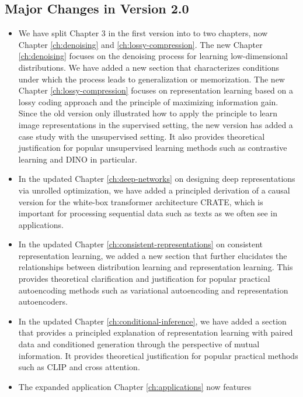 \documentclass[../../book-main.tex]{subfiles}
\begin{document}
\subsection*{Major Changes in Version 2.0}
\begin{itemize}
    \item We have split Chapter 3 in the first version into to two chapters, now
        Chapter \ref{ch:denoising} and \ref{ch:lossy-compression}. The new
        Chapter \ref{ch:denoising} focuses on the denoising process for learning
        low-dimensional distributions. We have added a new section that
        characterizes conditions under which the process leads to generalization
        or memorization. The new Chapter \ref{ch:lossy-compression} focuses on
        representation learning based on a lossy coding approach and the
        principle of maximizing information gain. Since the old version only
        illustrated how to apply the principle to learn image representations in
        the supervised setting, the new version has added a case study with the
        unsupervised setting. It also provides theoretical justification for
        popular unsupervised learning methods such as contrastive learning and DINO in particular.
    \item In the updated Chapter \ref{ch:deep-networks} on designing deep representations via unrolled optimization, we have added a principled  derivation of a causal version for the white-box transformer architecture CRATE, which is important for processing sequential data such as texts as we often see in applications.
    \item In the updated Chapter \ref{ch:consistent-representations} on consistent
        representation learning, we added a new section that further elucidates
        the relationships between distribution learning and representation
        learning. This provides theoretical clarification and justification for
        popular practical autoencoding methods such as variational autoencoding
        and representation autoencoders.
    \item In the updated Chapter \ref{ch:conditional-inference}, we have added
        a section that provides a principled explanation of representation
        learning with paired data and conditioned generation through the
        perspective of mutual information. It provides theoretical justification
        for popular practical methods such as CLIP and cross attention.
    \item The expanded application Chapter \ref{ch:applications} now features

\end{itemize}
\end{document}
